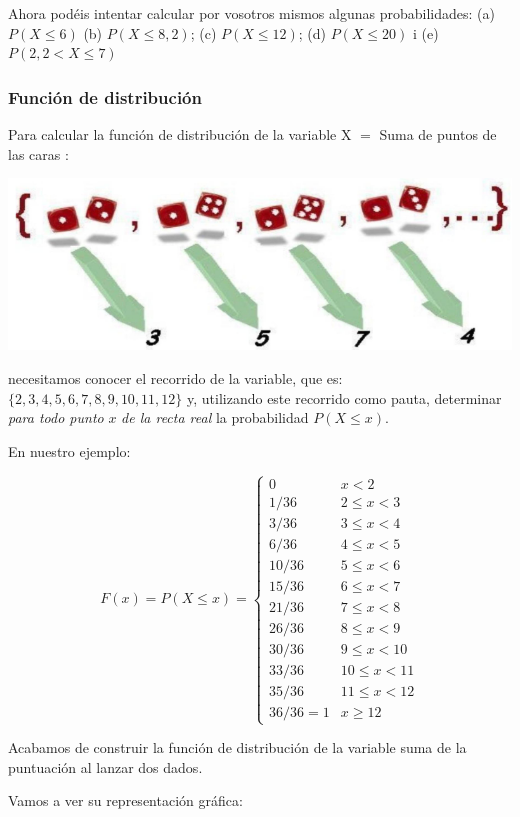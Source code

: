 \documentclass[
]{article}
\begin{document}
Ahora podéis intentar calcular por vosotros mismos algunas
probabilidades: (a) \(P(X \leq 6)\) (b) \(P(X \leq 8,2)\); (c)
\(P(X \leq 12)\); (d) \(P(X \leq 20)\) i (e) \(P(2,2<X \leq 7)\)

\subsubsection{Función de distribución}\label{funciuxf3n-de-distribuciuxf3n}

Para calcular la función de distribución de la variable X \(=\) Suma de
puntos de las caras :

\includegraphics{images/clipboard-2353777197.png}

necesitamos conocer el recorrido de la variable, que es:
\(\{2,3,4,5,6,7,8,9,10,11, 12\}\) y, utilizando este recorrido como pauta,
determinar \emph{para todo punto} \(x\) \emph{de la recta real} la probabilidad
\(P(X \leq x)\).

En nuestro ejemplo:

\[
F(x)=P(X \leq x)= \begin{cases}0 & x<2 \\ 1 / 36 & 2 \leq x<3 \\ 3 / 36 & 3 \leq x<4 \\ 6 / 36 & 4 \leq x<5 \\ 10 / 36 & 5 \leq x<6 \\ 15 / 36 & 6 \leq x<7 \\ 21 / 36 & 7 \leq x<8 \\ 26 / 36 & 8 \leq x<9 \\ 30 / 36 & 9 \leq x<10 \\ 33 / 36 & 10 \leq x<11 \\ 35 / 36 & 11 \leq x<12 \\ 36 / 36=1 & x \geq 12\end{cases}
\]

Acabamos de construir la función de distribución de la variable suma de
la puntuación al lanzar dos dados.

Vamos a ver su representación gráfica:
\end{document}
